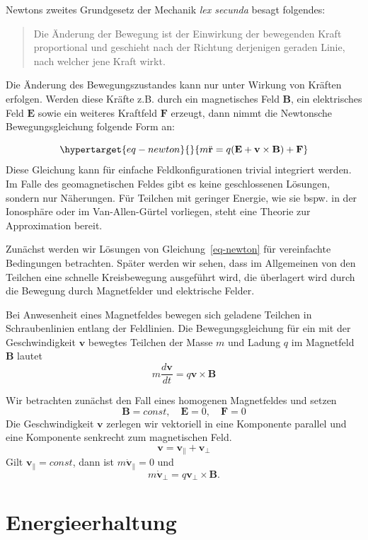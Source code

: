 \documentclass[
  a4paper,
  DIV=11]{scrreprt}
\begin{document}
Newtons zweites Grundgesetz der Mechanik \emph{lex secunda} besagt
folgendes:

\begin{quote}
Die Änderung der Bewegung ist der Einwirkung der bewegenden Kraft
proportional und geschieht nach der Richtung derjenigen geraden Linie,
nach welcher jene Kraft wirkt.
\end{quote}

Die Änderung des Bewegungszustandes kann nur unter Wirkung von Kräften
erfolgen. Werden diese Kräfte z.B. durch ein magnetisches Feld
\(\mathbf B\), ein elektrisches Feld \(\mathbf E\) sowie ein weiteres
Kraftfeld \(\mathbf F\) erzeugt, dann nimmt die Newtonsche
Bewegungsgleichung folgende Form an:

\begin{equation}\protect\hypertarget{eq-newton}{}{
m \ddot{\mathbf r} = q (\mathbf E + \mathbf v \times \mathbf B) + \mathbf F
}\label{eq-newton}\end{equation} Diese Gleichung kann für einfache
Feldkonfigurationen trivial integriert werden. Im Falle des
geomagnetischen Feldes gibt es keine geschlossenen Lösungen, sondern nur
Näherungen. Für Teilchen mit geringer Energie, wie sie bspw. in der
Ionosphäre oder im Van-Allen-Gürtel vorliegen, steht eine Theorie zur
Approximation bereit.

Zunächst werden wir Lösungen von Gleichung~\ref{eq-newton} für
vereinfachte Bedingungen betrachten. Später werden wir sehen, dass im
Allgemeinen von den Teilchen eine schnelle Kreisbewegung ausgeführt
wird, die überlagert wird durch die Bewegung durch Magnetfelder und
elektrische Felder.

Bei Anwesenheit eines Magnetfeldes bewegen sich geladene Teilchen in
Schraubenlinien entlang der Feldlinien. Die Bewegungsgleichung für ein
mit der Geschwindigkeit \(\mathbf v\) bewegtes Teilchen der Masse \(m\)
und Ladung \(q\) im Magnetfeld \(\mathbf B\) lautet \[
m \frac{d \mathbf v}{d t} = q \mathbf v \times \mathbf B
\]

Wir betrachten zunächst den Fall eines homogenen Magnetfeldes und setzen
\[
\mathbf B = const, \quad \mathbf E = 0, \quad \mathbf F = 0
\] Die Geschwindigkeit \(\mathbf v\) zerlegen wir vektoriell in eine
Komponente parallel und eine Komponente senkrecht zum magnetischen Feld.
\[
\mathbf v = \mathbf v_\| + \mathbf v_\perp
\] Gilt \(\mathbf v_\| = const\), dann ist \(m \dot{\mathbf v}_\| = 0\)
und \[
m \dot{\mathbf v}_\perp = q \mathbf v_\perp \times \mathbf B.
\]

\hypertarget{energieerhaltung}{%
\section{Energieerhaltung}\label{energieerhaltung}}
\end{document}

